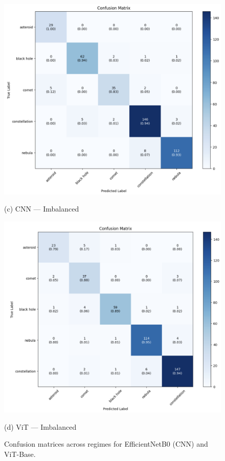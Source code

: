 \begin{figure}[!t]
\vspace{0.6em}

\begin{minipage}{0.48\textwidth}
  \centering
  \includegraphics[width=\linewidth]{generated/Imbalance-CNN.png}
  {\footnotesize (c) CNN — Imbalanced\par}
\end{minipage}\hfill
\begin{minipage}{0.48\textwidth}
  \centering
  \includegraphics[width=\linewidth]{generated/Imbalance-VIT.png}
  {\footnotesize (d) ViT — Imbalanced\par}
\end{minipage}

\caption{Confusion matrices across regimes for EfficientNetB0 (CNN) and ViT-Base.}
\label{fig:cm-grid}
\end{figure}

